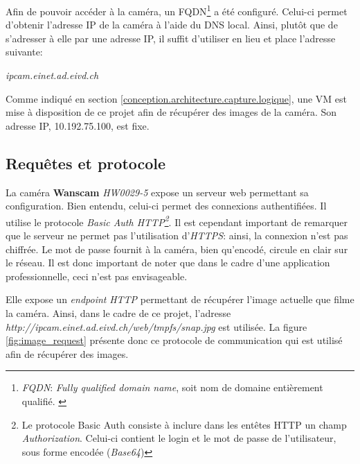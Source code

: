 Afin de pouvoir accéder à la caméra, un FQDN\footnote{\textit{FQDN}: \textit{Fully qualified domain name}, soit nom de domaine entièrement qualifié. \autocite{wiki:FQDN}} a été configuré. Celui-ci permet d'obtenir l'adresse IP de la caméra à l'aide du DNS local. Ainsi, plutôt que de s'adresser à elle par une adresse IP, il suffit d'utiliser en lieu et place l'adresse suivante:
\begin{center}
    \textit{ipcam.einet.ad.eivd.ch}
\end{center}


Comme indiqué en section \ref{conception.architecture.capture.logique}, une VM est mise à disposition de ce projet afin de récupérer des images de la caméra. Son adresse IP, 10.192.75.100, est fixe.

\subsection{Requêtes et protocole}
La caméra \textbf{Wanscam} \textit{HW0029-5} expose un serveur web permettant sa configuration. Bien entendu, celui-ci permet des connexions authentifiées. Il utilise le protocole \textit{Basic Auth HTTP\footnote{Le protocole Basic Auth consiste à inclure dans les entêtes HTTP un champ \textit{Authorization}. Celui-ci contient le login et le mot de passe de l'utilisateur, sous forme encodée (\textit{Base64})}}\autocite{wiki:basic-auth}. Il est cependant important de remarquer que le serveur ne permet pas l'utilisation d'\textit{HTTPS}: ainsi, la connexion n'est pas chiffrée. Le mot de passe fournit à la caméra, bien qu'encodé, circule en clair sur le réseau. Il est  donc important de noter que dans le cadre d'une application professionnelle, ceci n'est pas envisageable.

Elle expose un \textit{endpoint} \textit{HTTP} permettant de récupérer l'image actuelle que filme la caméra. Ainsi, dans le cadre de ce projet, l'adresse \textit{http://ipcam.einet.ad.eivd.ch/web/tmpfs/snap.jpg} est utilisée. La figure \ref{fig:image_request} présente donc ce protocole de communication qui est utilisé afin de récupérer des images.

